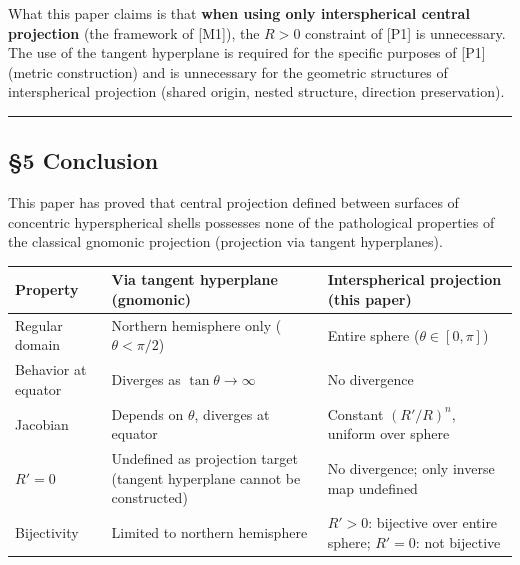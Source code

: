 \documentclass[
  a4paper]{article}
\newcounter{none} %
\begin{document}
What this paper claims is that \textbf{when using only interspherical
central projection} (the framework of {[}M1{]}), the \(R > 0\)
constraint of {[}P1{]} is unnecessary. The use of the tangent hyperplane
is required for the specific purposes of {[}P1{]} (metric construction)
and is unnecessary for the geometric structures of interspherical
projection (shared origin, nested structure, direction preservation).

\begin{center}\rule{0.5\linewidth}{0.5pt}\end{center}

\subsection{§5 Conclusion}\label{conclusion}

This paper has proved that central projection defined between surfaces
of concentric hyperspherical shells possesses none of the pathological
properties of the classical gnomonic projection (projection via tangent
hyperplanes).

{\def\LTcaptype{none} %
\begin{longtable}[]{@{}
  >{\raggedright\arraybackslash}p{}
  >{\raggedright\arraybackslash}p{}
  >{\raggedright\arraybackslash}p{}@{}}
\toprule\noalign{}
\begin{minipage}[b]{\linewidth}\raggedright
Property
\end{minipage} & \begin{minipage}[b]{\linewidth}\raggedright
Via tangent hyperplane (gnomonic)
\end{minipage} & \begin{minipage}[b]{\linewidth}\raggedright
Interspherical projection (this paper)
\end{minipage} \\
\midrule\noalign{}
\endhead
\bottomrule\noalign{}
\endlastfoot
Regular domain & Northern hemisphere only (\(\theta < \pi/2\)) & Entire
sphere (\(\theta \in [0, \pi]\)) \\
Behavior at equator & Diverges as \(\tan\theta \to \infty\) & No
divergence \\
Jacobian & Depends on \(\theta\), diverges at equator & Constant
\((R'/R)^n\), uniform over sphere \\
\(R' = 0\) & Undefined as projection target (tangent hyperplane cannot
be constructed) & No divergence; only inverse map undefined \\
Bijectivity & Limited to northern hemisphere & \(R' > 0\): bijective
over entire sphere; \(R' = 0\): not bijective \\
\end{longtable}
}
\end{document}
